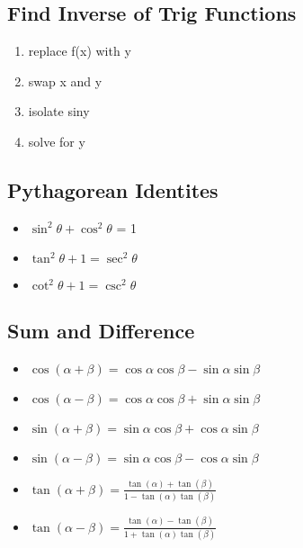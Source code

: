 \documentclass{report}
\begin{document}
      \bigbreak \noindent \bigbreak \noindent 
      \subsection{Find Inverse of Trig Functions}
        \begin{enumerate}
          \item replace f(x) with y
          \item swap x and y
          \item isolate siny
          \item solve for y
        \end{enumerate}

      \bigbreak \noindent \bigbreak \noindent 
      \subsection{Pythagorean Identites}
      \begin{itemize}
        \item $ \sin^{2}{\theta} + \cos^{2}{\theta}$ = 1
        \item $\tan^{2}{\theta} +1 = \sec^{2}{\theta}$
        \item $\cot^{2}{\theta } + 1 = \csc^{2}{\theta }$
      \end{itemize}

      \bigbreak \noindent \bigbreak \noindent 
      \subsection{Sum and Difference}
      \begin{itemize}
        \item $\cos{(\alpha + \beta)} = \cos{\alpha}\cos{\beta} - \sin{\alpha}\sin{\beta}$
        \item $\cos{(\alpha - \beta)} = \cos{\alpha}\cos{\beta} + \sin{\alpha}\sin{\beta}$
        \item $\sin{(\alpha + \beta)} = \sin{\alpha}\cos{\beta} + \cos{\alpha}\sin{\beta}$
        \item $\sin{(\alpha - \beta)} = \sin{\alpha}\cos{\beta} - \cos{\alpha}\sin{\beta}$
        \item $\tan{(\alpha + \beta)} = \frac{\tan(\alpha) + \tan(\beta)}{1-\tan(\alpha)\tan(\beta)} $
        \item $\tan{(\alpha - \beta)} = \frac{\tan(\alpha) - \tan(\beta)}{1+\tan(\alpha)\tan(\beta)} $
      \end{itemize}
\end{document}
